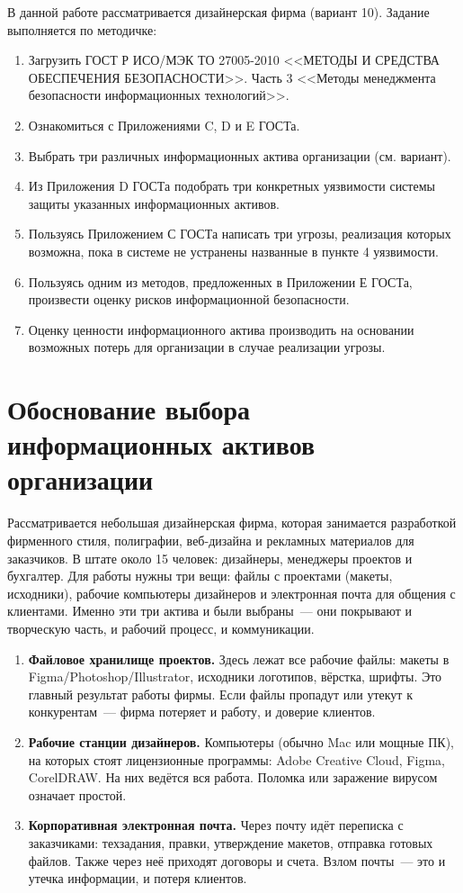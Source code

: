 \documentclass[a4paper,14pt]{extarticle}
\begin{document}
В данной работе рассматривается дизайнерская фирма (вариант 10). Задание выполняется по методичке:

\begin{enumerate}
\item Загрузить ГОСТ Р ИСО/МЭК ТО 27005-2010 <<МЕТОДЫ И СРЕДСТВА ОБЕСПЕЧЕНИЯ БЕЗОПАСНОСТИ>>. Часть 3 <<Методы менеджмента безопасности информационных технологий>>.
\item Ознакомиться с Приложениями C, D и E ГОСТа.
\item Выбрать три различных информационных актива организации (см. вариант).
\item Из Приложения D ГОСТа подобрать три конкретных уязвимости системы защиты указанных информационных активов.
\item Пользуясь Приложением С ГОСТа написать три угрозы, реализация которых возможна, пока в системе не устранены названные в пункте 4 уязвимости.
\item Пользуясь одним из методов, предложенных в Приложении Е ГОСТа, произвести оценку рисков информационной безопасности.
\item Оценку ценности информационного актива производить на основании возможных потерь для организации в случае реализации угрозы.
\end{enumerate}

\section{Обоснование выбора информационных активов организации}

Рассматривается небольшая дизайнерская фирма, которая занимается разработкой фирменного стиля, полиграфии, веб-дизайна и рекламных материалов для заказчиков. В штате около 15 человек: дизайнеры, менеджеры проектов и бухгалтер. Для работы нужны три вещи: файлы с проектами (макеты, исходники), рабочие компьютеры дизайнеров и электронная почта для общения с клиентами. Именно эти три актива и были выбраны~--- они покрывают и творческую часть, и рабочий процесс, и коммуникации.

\begin{enumerate}[label=\textbf{\arabic*.}]
\item \textbf{Файловое хранилище проектов.} Здесь лежат все рабочие файлы: макеты в Figma/Photoshop/Illustrator, исходники логотипов, вёрстка, шрифты. Это главный результат работы фирмы. Если файлы пропадут или утекут к конкурентам~--- фирма потеряет и работу, и доверие клиентов.

\item \textbf{Рабочие станции дизайнеров.} Компьютеры (обычно Mac или мощные ПК), на которых стоят лицензионные программы: Adobe Creative Cloud, Figma, CorelDRAW. На них ведётся вся работа. Поломка или заражение вирусом означает простой.

\item \textbf{Корпоративная электронная почта.} Через почту идёт переписка с заказчиками: техзадания, правки, утверждение макетов, отправка готовых файлов. Также через неё приходят договоры и счета. Взлом почты~--- это и утечка информации, и потеря клиентов.
\end{enumerate}
\end{document}
